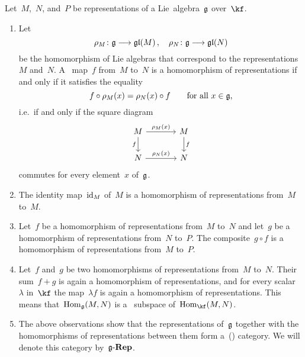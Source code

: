 \begin{remark}
	Let~$M$,~$N$, and~$P$ be representations of a Lie~algebra~$\mathfrak{g}$ over~$\kf$.
	\begin{enumerate}
		\item
			Let
			\[
				\rho_M
				\colon
				\glie
				\to
				\gllie(M) \,,
				\quad
				\rho_N
				\colon
				\glie
				\to
				\gllie(N)
			\]
			be the homomorphism of Lie algebras that correspond to the representations~$M$ and~$N$.
			A~{\linear{$\kf$}} map~$f$ from~$M$ to~$N$ is a homomorphism of representations if and only if it satisfies the equality
			\[
				f \circ \rho_M(x)
				=
				\rho_N(x) \circ f
				\qquad
				\text{for all~$x \in \mathfrak{g}$,}
			\]
			i.e.\ if and only if the square diagram
			\[
				\begin{tikzcd}[column sep = large]
					M
					\arrow{r}[above]{\rho_M(x)}
					\arrow{d}[left]{f}
					&
					M
					\arrow{d}[right]{f}
					\\
					N
					\arrow{r}[above]{\rho_N(x)}
					&
					N
				\end{tikzcd}
			\]
			commutes for every element~$x$ of~$\mathfrak{g}$.
		\item
			The identity map~$\mathrm{id}_M$ of~$M$ is a homomorphism of representations from~$M$ to~$M$.
		\item
			Let~$f$ be a homomorphism of representations from~$M$ to~$N$ and let~$g$ be a homomorphism of representations from~$N$ to~$P$.
			The composite~$g \circ f$ is a homomorphism of representations from~$M$ to~$P$.
		\item
			Let~$f$ and~$g$ be two homomorphisms of representations from~$M$ to~$N$.
			Their sum~$f + g$ is again a homomorphism of representations, and for every scalar~$\lambda$ in~$\kf$ the map~$\lambda f$ is again a homomorphism of representations.
			This means that~$\operatorname{Hom}_{\mathfrak{g}}(M,N)$ is a~{\linear{$\kf$}} subspace of~$\Hom_{\kf}(M,N)$.
		\item
			The above observations show that the representations of~$\mathfrak{g}$ together with the homomorphisms of representations between them form a~(\linear{$\kf$}) category.
			We will denote this category by~$\mathfrak{g}\text{-}\mathbf{Rep}$.


\end{enumerate}
\end{remark}
